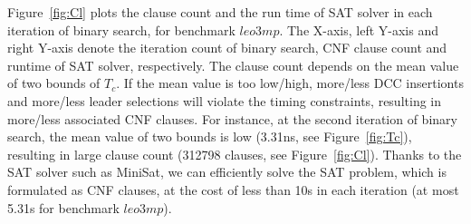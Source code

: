 Figure~\ref{fig:Cl} plots the clause count and the run time of SAT solver in each iteration of binary search, for benchmark $leo3mp$. The X-axis, left Y-axis and right Y-axis denote the iteration count of binary search, CNF clause count and runtime of SAT solver, respectively. The clause count depends on the mean value of two bounds of $T_{c}$. If the mean value is too low/high, more/less DCC insertionts and more/less leader selections will violate the timing constraints, resulting in more/less associated CNF clauses. For instance, at the second iteration of binary search, the mean value of two bounds is low (3.31ns, see Figure~\ref{fig:Tc}), resulting in large clause count (312798 clauses, see Figure~\ref{fig:Cl}). Thanks to the SAT solver such as MiniSat, we can efficiently solve the SAT problem, which is formulated as CNF clauses, at the cost of less than 10s in each iteration (at most 5.31s for benchmark $leo3mp$).








